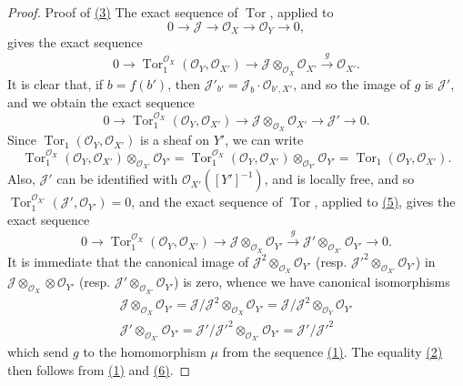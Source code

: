 \documentclass{article}
\newcommand{\scr}[1]{{\mathscr{#1}}}
\DeclareMathOperator{\Tor}{Tor}
\begin{document}
\begin{proof}{Proof of {\hyperref[section15equation3]{(3)}}}
  The exact sequence of $\Tor$, applied to
  \[
    0\to\scr{J}\to\scr{O}_X\to\scr{O}_Y\to0,
  \]
  gives the exact sequence
  \[
    0 \to \Tor_1^{\scr{O}_X}(\scr{O}_Y,\scr{O}_{X'}) \to \scr{J}\otimes_{\scr{O}_X}\scr{O}_{X'} \xrightarrow{g} \scr{O}_{X'}.
  \]
  It is clear that, if $b=f(b')$, then $\scr{J}'_{b'}=\scr{J}_b\cdot\scr{O}_{b',X'}$, and so the image of $g$ is $\scr{J}'$, and we obtain the exact sequence
  \[
  \label{section15equation5}
    0 \to \Tor_1^{\scr{O}_X}(\scr{O}_Y,\scr{O}_{X'}) \to \scr{J}\otimes_{\scr{O}_X}\scr{O}_{X'} \to \scr{J}' \to 0.
    \tag{5}
  \]
  Since $\Tor_1(\scr{O}_Y,\scr{O}_{X'})$ is a sheaf on $Y'$, we can write
  \[
    \Tor_1^{\scr{O}_X}(\scr{O}_Y,\scr{O}_{X'})\otimes_{\scr{O}_{X'}}\scr{O}_{Y'}
    = \Tor_1^{\scr{O}_X}(\scr{O}_Y,\scr{O}_{X'})\otimes_{\scr{O}_{Y'}}\scr{O}_{Y'}
    = \Tor_1(\scr{O}_Y,\scr{O}_{X'}).
  \]
  Also, $\scr{J}'$ can be identified with $\scr{O}_{X'}([Y']^{-1})$, and is locally free, and so $\Tor_1^{\scr{O}_{X'}}(\scr{J}',\scr{O}_{Y'}) = 0$, and the exact sequence of $\Tor$, applied to \hyperref[section15equation5]{(5)}, gives the exact sequence
  \[
  \label{section15equation6}
    0 \to \Tor_1^{\scr{O}_X}(\scr{O}_Y,\scr{O}_{X'}) \to \scr{J}\otimes_{\scr{O}_X}\scr{O}_{Y'} \xrightarrow{g} \scr{J}'\otimes_{\scr{O}_{X'}}\scr{O}_{Y'} \to 0.
    \tag{6}
  \]
  It is immediate that the canonical image of $\scr{J}^2\otimes_{\scr{O}_X}\scr{O}_{Y'}$ (resp. $\scr{J}'^2\otimes_{\scr{O}_{X'}}\scr{O}_{Y'}$) in $\scr{J}\otimes_{\scr{O}_X}\otimes\scr{O}_{Y'}$ (resp. $\scr{J}'\otimes_{\scr{O}_{X'}}\scr{O}_{Y'}$) is zero, whence we have canonical isomorphisms
  \begin{gather*}
    \scr{J}\otimes_{\scr{O}_X}\scr{O}_{Y'}
    = \scr{J}/\scr{J}^2\otimes_{\scr{O}_X}\scr{O}_{Y'}
    = \scr{J}/\scr{J}^2\otimes_{\scr{O}_Y}\scr{O}_{Y'}
  \\\scr{J}'\otimes_{\scr{O}_{X'}}\scr{O}_{Y'}
    = \scr{J}'/\scr{J}'^2\otimes_{\scr{O}_{X'}}\scr{O}_{Y'}
    = \scr{J}'/\scr{J}'^2
  \end{gather*}
  which send $g$ to the homomorphism $\mu$ from the sequence \hyperref[section15equation1]{(1)}.
  The equality \hyperref[section15equation2]{(2)} then follows from \hyperref[section15equation1]{(1)} and \hyperref[section15equation6]{(6)}.


\end{proof}
\end{document}
